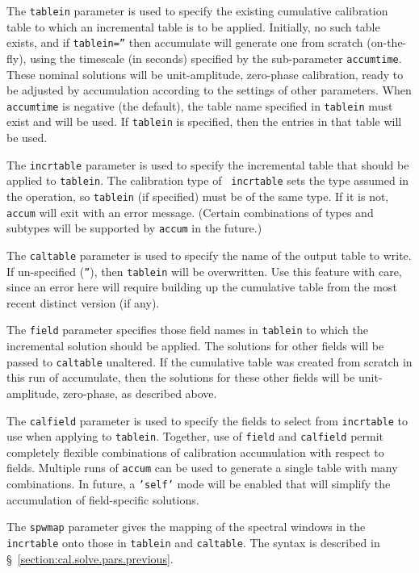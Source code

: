 The {\tt tablein} parameter is used to specify the existing cumulative
calibration table to which an incremental table is to be applied.
Initially, no such table exists, and if {\tt tablein=''} then
accumulate will generate one from
scratch (on-the-fly), using the timescale (in seconds) specified by
the sub-parameter {\tt accumtime}. These nominal solutions will be
unit-amplitude, zero-phase calibration, ready to
be adjusted by accumulation according to the settings of other
parameters.  When {\tt accumtime} is negative (the default), the table
name specified in {\tt tablein} must exist and will be used.  If 
{\tt tablein} is specified, then the entries in that
table will be used.

The {\tt incrtable} parameter is used to specify the incremental table
that should be applied to {\tt tablein}. The calibration type of {\tt
incrtable} sets the type assumed in the operation, so {\tt tablein}
(if specified) must be of the same type. If it is not, {\tt accum}
will exit with an error message. (Certain combinations of types and
subtypes will be supported by {\tt accum} in the future.)

The {\tt caltable} parameter is used to specify the name of the output
table to write. If un-specified ({\tt ''}), then {\tt tablein} will be
overwritten. Use this feature with care, since an error here will
require building up the cumulative table from the most recent distinct
version (if any).

The {\tt field} parameter specifies those field names in {\tt tablein} to
which the incremental solution should be applied. The solutions for
other fields will be passed to {\tt caltable} unaltered. If the cumulative
table was created from scratch in this run of accumulate, then the
solutions for these other fields will be unit-amplitude, zero-phase,
as described above.

The {\tt calfield} parameter is used to specify the fields to select
from {\tt incrtable} to use when applying to {\tt tablein}. Together,
use of {\tt field} and {\tt calfield} permit completely flexible combinations
of calibration accumulation with respect to fields. Multiple runs of
{\tt accum} can be used to generate a single table with many combinations.
In future, a {\tt 'self'} mode will be enabled that will simplify the
accumulation of field-specific solutions.

The {\tt spwmap} parameter gives the mapping of the spectral windows
in the {\tt incrtable} onto those in {\tt tablein} and {\tt caltable}.
The syntax is described in \S~\ref{section:cal.solve.pars.previous}.

